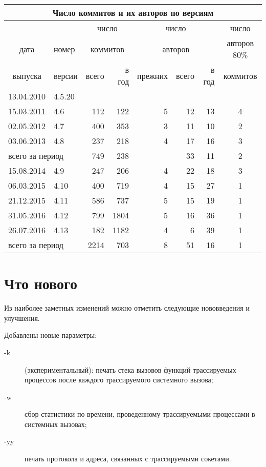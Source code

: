 \documentclass[russian,a4paper,12pt]{article}
\begin{document}
\begin{tabular}{clrrrrrc}
\hline
\multicolumn{8}{c}{Число коммитов и их авторов по версиям} \\ \hline
           &        & \multicolumn{2}{c}{число}    & \multicolumn{3}{c}{число}   & число \\
дата       & номер  & \multicolumn{2}{c}{коммитов} & \multicolumn{3}{c}{авторов} & авторов 80\% \\
выпуска    & версии & всего & в год                & прежних & всего & в год     & коммитов \\ \hline
13.04.2010 & 4.5.20 &       &     &   &    &    &   \\ \hline
15.03.2011 & 4.6    & 112   & 122 & 5 & 12 & 13 & 4 \\ \hline
02.05.2012 & 4.7    & 400   & 353 & 3 & 11 & 10 & 2 \\ \hline
03.06.2013 & 4.8    & 237   & 218 & 4 & 17 & 16 & 3 \\ \hline
\multicolumn{2}{l}{всего за период} & 749 & 238 & & 33 & 11 & 2 \\ \hline
\hline
15.08.2014 & 4.9    & 247   &  206 & 4 & 22 & 18 & 3 \\ \hline
06.03.2015 & 4.10   & 400   &  719 & 4 & 15 & 27 & 1 \\ \hline
21.12.2015 & 4.11   & 586   &  737 & 5 & 15 & 19 & 1 \\ \hline
31.05.2016 & 4.12   & 799   & 1804 & 5 & 16 & 36 & 1 \\ \hline
26.07.2016 & 4.13   & 182   & 1182 & 4 &  6 & 39 & 1 \\ \hline
\multicolumn{2}{l}{всего за период} & 2214 & 703 & 8 & 51 & 16 & 1 \\ \hline
\end{tabular} \bigskip

\section*{Что нового}
Из наиболее заметных изменений можно отметить следующие нововведения и
улучшения.

Добавлены новые параметры:
\begin{description}
\item[-k] (экспериментальный): печать стека вызовов функций трассируемых
процессов после каждого трассируемого системного вызова;
\item[-w] сбор статистики по времени, проведенному трассируемыми процессами
в системных вызовах;
\item[-yy] печать протокола и адреса, связанных с трассируемыми сокетами.
\end{description}
\end{document}
